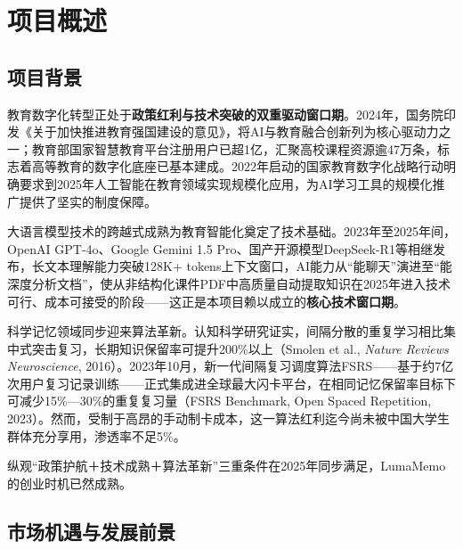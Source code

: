 ﻿%

\chapter{项目概述}

\section{项目背景}

教育数字化转型正处于\textbf{政策红利与技术突破的双重驱动窗口期}。2024年，国务院印发《关于加快推进教育强国建设的意见》，将AI与教育融合创新列为核心驱动力之一；教育部国家智慧教育平台注册用户已超1亿，汇聚高校课程资源逾47万条，标志着高等教育的数字化底座已基本建成。2022年启动的国家教育数字化战略行动明确要求到2025年人工智能在教育领域实现规模化应用，为AI学习工具的规模化推广提供了坚实的制度保障。

大语言模型技术的跨越式成熟为教育智能化奠定了技术基础。2023年至2025年间，OpenAI GPT-4o、Google Gemini 1.5 Pro、国产开源模型DeepSeek-R1等相继发布，长文本理解能力突破128K+ tokens上下文窗口，AI能力从“能聊天”演进至“能深度分析文档”，使从非结构化课件PDF中高质量自动提取知识在2025年进入技术可行、成本可接受的阶段——这正是本项目赖以成立的\textbf{核心技术窗口期}。

科学记忆领域同步迎来算法革新。认知科学研究证实，间隔分散的重复学习相比集中式突击复习，长期知识保留率可提升200\%以上（Smolen et al., \textit{Nature Reviews Neuroscience}, 2016）。2023年10月，新一代间隔复习调度算法FSRS——基于约7亿次用户复习记录训练——正式集成进全球最大闪卡平台，在相同记忆保留率目标下可减少15\%—30\%的重复复习量（FSRS Benchmark, Open Spaced Repetition, 2023）。然而，受制于高昂的手动制卡成本，这一算法红利迄今尚未被中国大学生群体充分享用，渗透率不足5\%。

纵观“政策护航＋技术成熟＋算法革新”三重条件在2025年同步满足，LumaMemo的创业时机已然成熟。

\section{市场机遇与发展前景}

